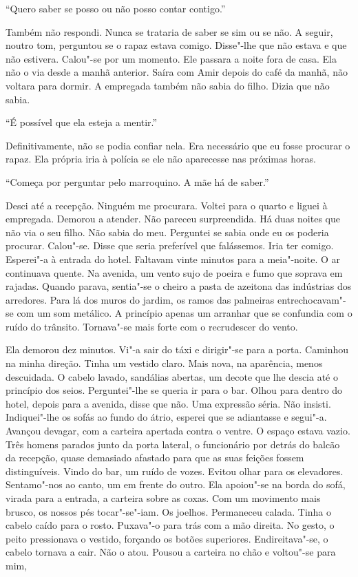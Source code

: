 ``Quero saber se posso ou não posso contar contigo.''

Também não respondi. Nunca se trataria de saber se sim ou se não. A
seguir, noutro tom, perguntou se o rapaz estava comigo. Disse"-lhe que
não estava e que não estivera. Calou"-se por um momento. Ele passara a
noite fora de casa. Ela não o via desde a manhã anterior. Saíra com Amir
depois do café da manhã, não voltara para dormir. A empregada também
não sabia do filho. Dizia que não sabia.

``É possível que ela esteja a mentir.''

Definitivamente, não se podia confiar nela. Era necessário que eu fosse
procurar o rapaz. Ela própria iria à polícia se ele não aparecesse nas
próximas horas.

``Começa por perguntar pelo marroquino. A mãe há de saber.''

Desci até a recepção. Ninguém me procurara. Voltei para o quarto e
liguei à empregada. Demorou a atender. Não pareceu surpreendida. Há duas
noites que não via o seu filho. Não sabia do meu. Perguntei se sabia
onde eu os poderia procurar. Calou"-se. Disse que seria preferível que
falássemos. Iria ter comigo. Esperei"-a à entrada do hotel. Faltavam
vinte minutos para a meia"-noite. O ar continuava quente. Na avenida, um
vento sujo de poeira e fumo que soprava em rajadas. Quando parava,
sentia"-se o cheiro a pasta de azeitona das indústrias dos arredores.
Para lá dos muros do jardim, os ramos das palmeiras entrechocavam"-se
com um som metálico. A princípio apenas um arranhar que se confundia com
o ruído do trânsito. Tornava"-se mais forte com o recrudescer do vento.

Ela demorou dez minutos. Vi"-a sair do táxi e dirigir"-se para a porta.
Caminhou na minha direção. Tinha um vestido claro. Mais nova, na
aparência, menos descuidada. O cabelo lavado, sandálias abertas, um
decote que lhe descia até o princípio dos seios. Perguntei"-lhe se
queria ir para o bar. Olhou para dentro do hotel, depois para a avenida,
disse que não. Uma expressão séria. Não insisti. Indiquei"-lhe os sofás
ao fundo do átrio, esperei que se adiantasse e segui"-a. Avançou
devagar, com a carteira apertada contra o ventre. O espaço estava vazio.
Três homens parados junto da porta lateral, o funcionário por detrás do
balcão da recepção, quase demasiado afastado para que as suas feições
fossem distinguíveis. Vindo do bar, um ruído de vozes. Evitou olhar para
os elevadores. Sentamo"-nos ao canto, um em frente do outro. Ela
apoiou"-se na borda do sofá, virada para a entrada, a carteira sobre as
coxas. Com um movimento mais brusco, os nossos pés tocar"-se"-iam. Os
joelhos. Permaneceu calada. Tinha o cabelo caído para o rosto. Puxava"-o
para trás com a mão direita. No gesto, o peito pressionava o vestido,
forçando os botões superiores. Endireitava"-se, o cabelo tornava a cair.
Não o atou. Pousou a carteira no chão e voltou"-se para mim,

